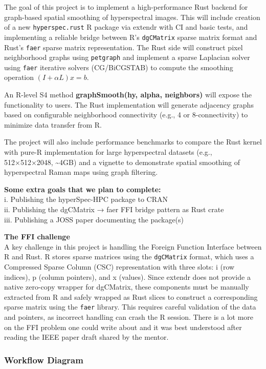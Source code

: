\documentclass[11pt]{article}
\begin{document}
The goal of this project is to implement a high-performance Rust backend
for graph-based spatial smoothing of hyperspectral images. This will
include creation of a new \texttt{hyperspec.rust} R package via extendr
with CI and basic tests, and implementing a reliable bridge between R's
\texttt{dgCMatrix} sparse matrix format and Rust's \texttt{faer} sparse
matrix representation. The Rust side will construct pixel neighborhood
graphs using \texttt{petgraph} and implement a sparse Laplacian solver
using \texttt{faer} iterative solvers (CG/BiCGSTAB) to compute the
smoothing operation \((I + αL)x = b\).

An R-level S4 method \textbf{graphSmooth(hy, alpha, neighbors)} will
expose the functionality to users. The Rust implementation will generate
adjacency graphs based on configurable neighborhood connectivity (e.g.,
4 or 8-connectivity) to minimize data transfer from R.

The project will also include performance benchmarks to compare the Rust
kernel with pure-R implementation for large hyperspectral datasets
(e.g., 512×512×2048, \textasciitilde4GB) and a vignette to demonstrate
spatial smoothing of hyperspectral Raman maps using graph filtering.

\textbf{Some extra goals that we plan to complete:}\\
i. Publishing the hyperSpec-HPC package to CRAN\\
ii. Publishing the dgCMatrix → faer FFI bridge pattern as Rust crate\\
iii. Publishing a JOSS paper documenting the package(s)

\textbf{The FFI challenge}\\
A key challenge in this project is handling the Foreign Function
Interface between R and Rust. R stores sparse matrices using the
\texttt{dgCMatrix} format, which uses a Compressed Sparse Column (CSC)
representation with three slots: i (row indices), p (column pointers),
and x (values). Since extendr does not provide a native zero-copy
wrapper for dgCMatrix, these components must be manually extracted from
R and safely wrapped as Rust slices to construct a corresponding sparse
matrix using the \texttt{faer} library. This requires careful validation
of the data and pointers, as incorrect handling can crash the R session.
There is a lot more on the FFI problem one could write about and it was
best understood after reading the IEEE paper draft shared by the mentor.

\hypertarget{workflow-diagram}{%
\subsubsection{Workflow Diagram}\label{workflow-diagram}}
\end{document}
